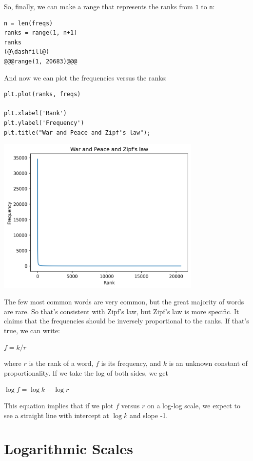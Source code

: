So, finally, we can make a range that represents the ranks from
\passthrough{\lstinline!1!} to \passthrough{\lstinline!n!}:

\begin{lstlisting}[]
n = len(freqs)
ranks = range(1, n+1)
ranks
(@\dashfill@)
@@@range(1, 20683)@@@
\end{lstlisting}

And now we can plot the frequencies versus the ranks:

\begin{lstlisting}[]
plt.plot(ranks, freqs)

plt.xlabel('Rank')
plt.ylabel('Frequency')
plt.title("War and Peace and Zipf's law");
\end{lstlisting}

\begin{center}
\includegraphics[width=4in]{chapters/06_plotting_files/06_plotting_73_0.png}
\end{center}

The few most common words are very common, but the great majority of
words are rare. So that's consistent with Zipf's law, but Zipf's law is
more specific. It claims that the frequencies should be inversely
proportional to the ranks. If that's true, we can write:

\(f = k / r\)

where \(r\) is the rank of a word, \(f\) is its frequency, and \(k\) is
an unknown constant of proportionality. If we take the log of both
sides, we get

\(\log f = \log k - \log r\)

This equation implies that if we plot \(f\) versus \(r\) on a log-log
scale, we expect to see a straight line with intercept at \(\log k\) and
slope -1.

\hypertarget{logarithmic-scales}{%
\section{Logarithmic Scales}\label{logarithmic-scales}}

